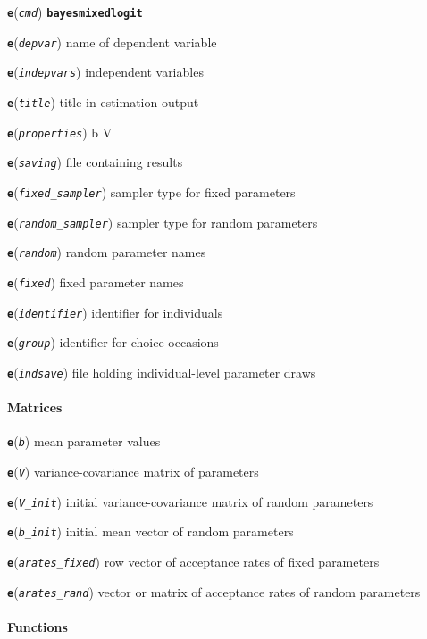 \documentclass[11pt]{article}
\begin{document}
\textbf{\texttt{e}}(\emph{\texttt{cmd}})
\textbf{\texttt{bayesmixedlogit}}

\textbf{\texttt{e}}(\emph{\texttt{depvar}}) name of dependent variable

\textbf{\texttt{e}}(\emph{\texttt{indepvars}}) independent variables

\textbf{\texttt{e}}(\emph{\texttt{title}}) title in estimation output

\textbf{\texttt{e}}(\emph{\texttt{properties}}) b V

\textbf{\texttt{e}}(\emph{\texttt{saving}}) file containing results

\textbf{\texttt{e}}(\emph{\texttt{fixed\_sampler}}) sampler type for
fixed parameters

\textbf{\texttt{e}}(\emph{\texttt{random\_sampler}}) sampler type for
random parameters

\textbf{\texttt{e}}(\emph{\texttt{random}}) random parameter names

\textbf{\texttt{e}}(\emph{\texttt{fixed}}) fixed parameter names

\textbf{\texttt{e}}(\emph{\texttt{identifier}}) identifier for
individuals

\textbf{\texttt{e}}(\emph{\texttt{group}}) identifier for choice
occasions

\textbf{\texttt{e}}(\emph{\texttt{indsave}}) file holding
individual-level parameter draws

\hypertarget{matrices}{%
\paragraph{Matrices}\label{matrices}}

\textbf{\texttt{e}}(\emph{\texttt{b}}) mean parameter values

\textbf{\texttt{e}}(\emph{\texttt{V}}) variance-covariance matrix of
parameters

\textbf{\texttt{e}}(\emph{\texttt{V\_init}}) initial variance-covariance
matrix of random parameters

\textbf{\texttt{e}}(\emph{\texttt{b\_init}}) initial mean vector of
random parameters

\textbf{\texttt{e}}(\emph{\texttt{arates\_fixed}}) row vector of
acceptance rates of fixed parameters

\textbf{\texttt{e}}(\emph{\texttt{arates\_rand}}) vector or matrix of
acceptance rates of random parameters

\hypertarget{functions}{%
\paragraph{Functions}\label{functions}}
\end{document}
